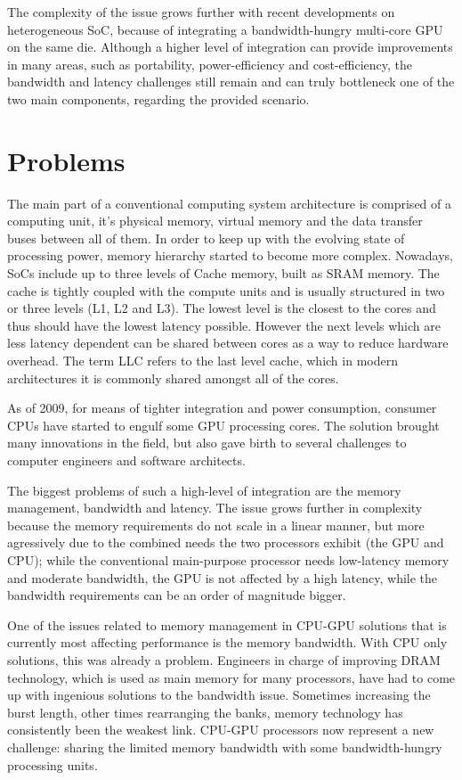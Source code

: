 \documentclass[12pt,journal,compsoc]{IEEEtran}
\begin{document}
The complexity of the issue grows further with recent developments on heterogeneous SoC, because of integrating a bandwidth-hungry multi-core GPU on the same die. Although a higher level of integration can provide improvements in many areas, such as portability, power-efficiency and cost-efficiency, the bandwidth and latency challenges still remain and can truly bottleneck one of the two main components, regarding the provided scenario.

\section{Problems}
The main part of a conventional computing system architecture is comprised of a computing unit, it's physical memory, virtual memory and the data transfer buses between all of them. In order to keep up with the evolving state of processing power, memory hierarchy started to become more complex. Nowadays, SoCs include up to three levels of Cache memory, built as SRAM memory. The cache is tightly coupled with the compute units and is usually structured in two or three levels (L1, L2 and L3). The lowest level is the closest to the cores and thus should have the lowest latency possible. However the next levels which are less latency dependent can be shared between cores as a way to reduce hardware overhead. The term LLC refers to the last level cache, which in modern architectures it is commonly shared amongst all of the cores.

As of 2009, for means of tighter integration and power consumption, consumer CPUs have started to engulf some GPU processing cores. The solution brought many innovations in the field, but also gave birth to several challenges to computer engineers and software architects. 

The biggest problems of such a high-level of integration are the memory management, bandwidth and latency. The issue grows further in complexity because the memory requirements do not scale in a linear manner, but more agressively due to the combined needs the two processors exhibit (the GPU and CPU); while the conventional main-purpose processor needs low-latency memory and moderate bandwidth, the GPU is not affected by a high latency, while the bandwidth requirements can be an order of magnitude bigger.

One of the issues related to memory management in CPU-GPU solutions that is currently most affecting performance is the memory bandwidth. With CPU only solutions, this was already a problem. Engineers in charge of improving DRAM technology, which is used as main memory for many processors, have had to come up with ingenious solutions to the bandwidth issue. Sometimes increasing the burst length, other times rearranging the banks, memory technology has consistently been the weakest link. CPU-GPU processors now represent a new challenge: sharing the limited memory bandwidth with some bandwidth-hungry processing units.
\end{document}
